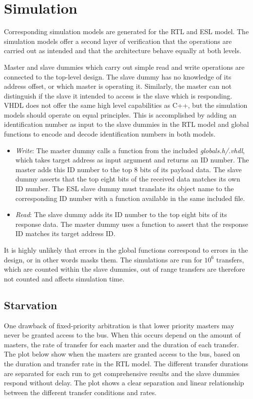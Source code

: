 \section{Simulation}
\label{sec:sim}
Corresponding simulation models are generated for the RTL and ESL model. The simulation models offer a second layer of verification that the operations are carried out as intended and that the architecture behave equally at both levels. \par
Master and slave dummies which carry out simple read and write operations are connected to the top-level design. The slave dummy has no knowledge of its address offset, or which master is operating it. Similarly, the master can not distinguish if the slave it intended to access is the slave which is responding. VHDL does not offer the same high level capabilities as C++, but the simulation models should operate on equal principles. This is accomplished by adding an identification number as input to the slave dummies in the RTL model and global functions to encode and decode identification numbers in both models. 
\begin{itemize}
 \item \textit{Write}: The master dummy calls a function from the included \textit{globals.h/.vhdl}, which takes target address as input argument and returns an ID number. The master adds this ID number to the top 8 bits of its payload data. The slave dummy asserts that the top eight bits of the received data matches its own ID number. The ESL slave dummy must translate its object name to the corresponding ID number with a function available in the same included file. 
 \item \textit{Read}: The slave dummy adds its ID number to the top eight bits of its response data. The master dummy uses a function to assert that the response ID matches its target address ID.   
\end{itemize}  

It is highly unlikely that errors in the global functions correspond to errors in the design, or in other words masks them. The simulations are run for $10^6$ transfers, which are counted within the slave dummies, out of range transfers are therefore not counted and affects simulation time.  

\subsection{Starvation}
One drawback of fixed-priority arbitration is that lower priority masters may never be granted access to the bus. When this occurs depend on the amount of masters, the rate of transfer for each master and the duration of each transfer. The plot below show when the masters are granted access to the bus, based on the duration and transfer rate in the RTL model. The different transfer durations are separated for each run to get comprehensive results and the slave dummies respond without delay. The plot shows a clear separation and linear relationship between the different transfer conditions and rates. 

